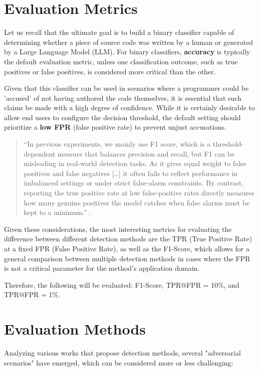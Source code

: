 \section{Evaluation Metrics}
Let us recall that the ultimate goal is to build a 
binary classifier capable of determining whether a piece 
of source code was written by a human or generated by a 
Large Language Model (LLM). For binary classifiers, 
\textbf{accuracy} is typically the default evaluation 
metric, unless one classification outcome, such as true 
positives or false positives, is considered more critical 
than the other. 

Given that this classifier can be used 
in scenarios where a programmer could be 'accused' of 
not having authored the code themselves, it is essential 
that such claims be made with a high degree of confidence. 
While it is certainly desirable to allow end users to 
configure the decision threshold, the default setting 
should prioritize a \textbf{low FPR} (false positive rate) 
to prevent unjust accusations.
\begin{quote}
    “In previous experiments, we mainly use F1 score, 
    which is a threshold-dependent measure that balances 
    precision and recall, but F1 can be misleading in 
    real-world detection tasks. As it gives equal weight 
    to false positives and false negatives […] it often 
    fails to reflect performance in imbalanced settings or 
    under strict false-alarm constraints. By contrast, 
    reporting the true positive rate at low false-positive 
    rates directly measures how many genuine positives the 
    model catches when false alarms must be kept to a minimum.”
    \cite{guo2025codemirage}.
\end{quote}


Given these considerations, the most interesting metrics for evaluating 
the difference between different detection methods are the 
TPR (True Positive Rate) at a fixed FPR (False Positive Rate), 
as well as the F1-Score, which allows for a general comparison 
between multiple detection methods in cases where the FPR is not a 
critical parameter for the method's application domain.

Therefore, the following will be evaluated: F1-Score, TPR@FPR = 10\%, and TPR@FPR = 1\%.


\section{Evaluation Methods}
Analyzing various works that propose detection methods, several 
"adversarial scenarios" have emerged, which can be considered more or less challenging:

